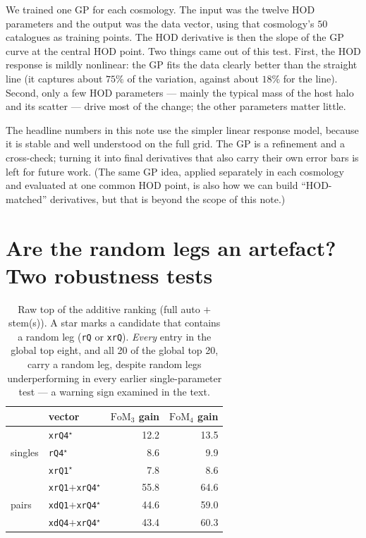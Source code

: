 \documentclass[11pt]{article}
\newcommand{\FoM}{\mathrm{FoM}}
\newcommand{\code}[1]{\texttt{#1}}
\begin{document}
We trained one GP for each cosmology.  The input was the twelve HOD parameters and
the output was the data vector, using that cosmology's $50$ catalogues as training
points.  The HOD derivative is then the slope of the GP curve at the central HOD
point.  Two things came out of this test.  First, the HOD response is mildly
nonlinear: the GP fits the data clearly better than the straight line (it captures
about $75\%$ of the variation, against about $18\%$ for the line).  Second, only a
few HOD parameters --- mainly the typical mass of the host halo and its scatter
--- drive most of the change; the other parameters matter little.

The headline numbers in this note use the simpler linear response model, because
it is stable and well understood on the full grid.  The GP is a refinement and a
cross-check; turning it into final derivatives that also carry their own error
bars is left for future work.  (The same GP idea, applied separately in each
cosmology and evaluated at one common HOD point, is also how we can build
``HOD-matched'' derivatives, but that is beyond the scope of this note.)

\section{Are the random legs an artefact? Two robustness tests}
\label{sec:caveat}

\begin{table}[t]
\centering
\caption{Raw top of the additive ranking (full auto $+$ stem(s)).  A star
marks a candidate that contains a random leg (\code{rQ} or \code{xrQ}).
\emph{Every} entry in the global top eight, and all 20 of the global top 20,
carry a random leg, despite random legs underperforming in every earlier
single-parameter test --- a warning sign examined in the text.}
\label{tab:raw}
\begin{tabular}{llrr}
\toprule
& vector & $\FoM_3$ gain & $\FoM_4$ gain \\
\midrule
\multirow{3}{*}{singles}
& \code{xrQ4}$^\star$        & 12.2 & 13.5 \\
& \code{rQ4}$^\star$         &  8.6 &  9.9 \\
& \code{xrQ1}$^\star$        &  7.8 &  8.6 \\
\midrule
\multirow{3}{*}{pairs}
& \code{xrQ1}$+$\code{xrQ4}$^\star$ & 55.8 & 64.6 \\
& \code{xdQ1}$+$\code{xrQ4}$^\star$ & 44.6 & 59.0 \\
& \code{xdQ4}$+$\code{xrQ4}$^\star$ & 43.4 & 60.3 \\
\bottomrule
\end{tabular}
\end{table}
\end{document}

